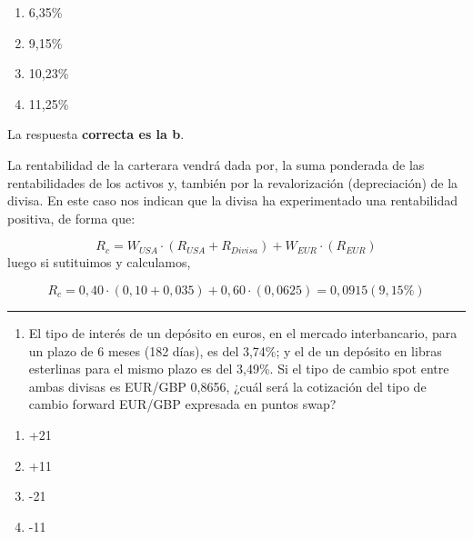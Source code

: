 \documentclass[
  letterpaper,
  DIV=11,
  numbers=noendperiod]{scrreprt}
\providecommand{\tightlist}{%
  \setlength{\itemsep}{0pt}\setlength{\parskip}{0pt}}\usepackage{longtable,booktabs,array}
\begin{document}
\begin{enumerate}
\def\labelenumi{\alph{enumi}.}
\item
  6,35\%
\item
  9,15\%
\item
  10,23\%
\item
  11,25\%
\end{enumerate}

\begin{tcolorbox}[enhanced jigsaw, left=2mm, opacityback=0, colback=white, breakable, arc=.35mm, bottomrule=.15mm, rightrule=.15mm, toprule=.15mm, leftrule=.75mm, colframe=quarto-callout-tip-color-frame]
\begin{minipage}[t]{5.5mm}
\textcolor{quarto-callout-tip-color}{\faLightbulb}
\end{minipage}%
\begin{minipage}[t]{\textwidth - 5.5mm}

La respuesta \textbf{correcta es la b}.

La rentabilidad de la carterara vendrá dada por, la suma ponderada de
las rentabilidades de los activos y, también por la revalorización
(depreciación) de la divisa. En este caso nos indican que la divisa ha
experimentado una rentabilidad positiva, de forma que:

\[R_c=W_{USA}\cdot (R_{USA}+R_{Divisa})+W_{EUR}\cdot (R_{EUR})\] luego
si sutituimos y calculamos,

\[R_c=0,40\cdot (0,10+0,035)+0,60\cdot (0,0625)=0,0915(9,15\%)\]

\end{minipage}%
\end{tcolorbox}

\begin{center}\rule{0.5\linewidth}{0.5pt}\end{center}

\begin{enumerate}
\def\labelenumi{\arabic{enumi}.}
\setcounter{enumi}{51}
\tightlist
\item
  El tipo de interés de un depósito en euros, en el mercado
  interbancario, para un plazo de 6 meses (182 días), es del 3,74\%; y
  el de un depósito en libras esterlinas para el mismo plazo es del
  3,49\%. Si el tipo de cambio spot entre ambas divisas es EUR/GBP
  0,8656, ¿cuál será la cotización del tipo de cambio forward EUR/GBP
  expresada en puntos swap?
\end{enumerate}

\begin{enumerate}
\def\labelenumi{\alph{enumi})}
\item
  +21
\item
  +11
\item
  -21
\item
  -11
\end{enumerate}
\end{document}
